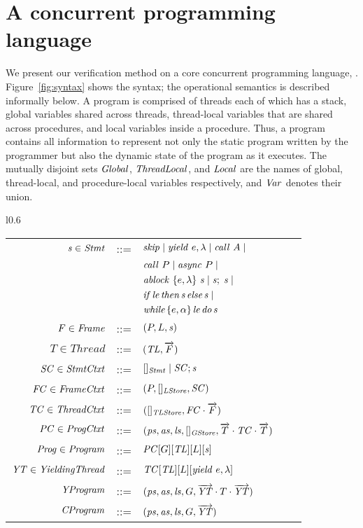 \section{A concurrent programming language}
\label{sec:language}

We present our verification method on a core concurrent programming language, \civl.
Figure~\ref{fig:syntax} shows the syntax;  the operational semantics is described informally below.
A \civl program is comprised of threads each of which has a stack, global variables shared across threads, 
thread-local variables that are shared across procedures, and local variables inside a procedure.
Thus, a program contains all information to represent not only the static program 
written by the programmer but also the dynamic state of the program as it executes.
The mutually disjoint sets $\mathit{Global}$, $\mathit{ThreadLocal}$, and $\mathit{Local}$ are the names of global, thread-local, and procedure-local variables 
respectively, and $\mathit{Var}$ denotes their union.
\begin{wrapfigure}[14]{l}{0.6\textwidth}
\vspace*{-0.5cm}
\setlength{\tabcolsep}{3pt}
\scriptsize{
\begin{tabular}{rclcl}
$\mathit{s} \in \mathit{Stmt}$ &::= & $\mathit{skip} \mid \mathit{yield}\ e,\lambda \mid \mathit{call}\ A \mid$ \\
                  & & $\mathit{call}\ P \mid \mathit{async}\ P \mid$ \\
                  & & $\mathit{ablock}\ {\{e,\lambda\}}\ {\mathit{s}} \mid \mathit{s};\;\mathit{s} \mid$\\
                  & & $\mathit{if}\hspace{0.5mm}{\mathit{le}}\hspace{0.5mm}\mathit{then}\hspace{0.5mm}{\mathit{s}}\hspace{0.5mm}\mathit{else}\hspace{0.5mm}{\mathit{s}} \mid$ \\
                  & & $\mathit{while}\hspace{0.5mm}\{e,\alpha\}\hspace{0.5mm}{\mathit{le}}\hspace{0.5mm}\mathit{do}\hspace{0.5mm}{\mathit{s}}$ \\
$F \in \mathit{Frame}$ &::= & $(P, L, \mathit{s})$ \\
$T \in \mathit{Thread}$ &::= &$(\mathit{TL}, \overrightarrow{F})$ \\
$\mathit{SC} \in \mathit{StmtCtxt}$ &::= &$[]_{\mathit{Stmt}} \mid \mathit{SC};\mathit{s}$ \\
$\mathit{FC} \in \mathit{FrameCtxt}$ &::= & $(P, []_{\mathit{LStore}}, \mathit{SC})$ \\
$\mathit{TC} \in \mathit{ThreadCtxt}$ &::= &$([]_{\mathit{TLStore}}, \mathit{FC}\cdot\overrightarrow{F})$ \\
$\mathit{PC} \in \mathit{ProgCtxt}$ &::= & $(\mathit{ps}, \mathit{as}, \mathit{ls}, []_{\mathit{GStore}}, \overrightarrow{T} \cdot \mathit{TC} \cdot \overrightarrow{T})$ \\
$\mathit{Prog} \in \mathit{Program}$ &::= & $\mathit{PC}[G][\mathit{TL}][L][\mathit{s}]$ \\
$\mathit{YT} \in \mathit{YieldingThread}$ &::= &$\mathit{TC}[\mathit{TL}][L][\mathit{yield}\ e,\lambda]$ \\
$\mathit{YProgram}$ &::= & $(\mathit{ps}, \mathit{as}, \mathit{ls}, G, \overrightarrow{\mathit{YT}} \cdot T \cdot \overrightarrow{\mathit{YT}})$ \\
$\mathit{CProgram}$ &::= & $(\mathit{ps}, \mathit{as}, \mathit{ls}, G, \overrightarrow{\mathit{YT}})$
\end{tabular}
}
\caption{Syntax}
\label{fig:syntax}
\end{wrapfigure}

